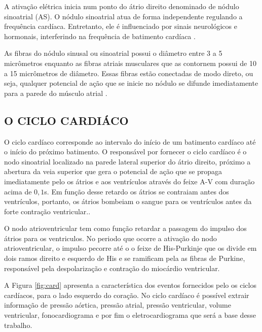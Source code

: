 \documentclass[12pt, a4paper]{article}
\begin{document}
A ativação elétrica inicia num ponto do átrio direito denominado de nódulo sinoatrial (AS). O nódulo sinoatrial atua de forma independente regulando a frequência cardíaca. Entretanto, ele é influenciado por sinais neurológicos e hormonais, interferindo na frequência de batimento cardíaca \cite{silva}.

As fibras do nódulo sinusal ou sinoatrial possui o diâmetro entre 3 a 5 micrômetros enquanto as fibras atriais musculares que as contornem possui de 10 a 15 micrômetros de diâmetro. Essas fibras estão conectadas de modo direto, ou seja, qualquer potencial de ação que se inicie no nódulo se difunde imediatamente para a parede do músculo atrial \cite{guyton}.

\subsection{O CICLO CARDIÁCO}

\hspace*{0.8cm}O ciclo cardíaco corresponde ao intervalo do início de um batimento cardíaco até o início do próximo batimento. O responsável por fornecer o ciclo cardíaco é o nodo sinoatrial localizado na parede lateral superior do átrio direito, próximo a abertura da veia superior que gera o potencial de ação que se propaga imediatamente pelo os átrios e aos ventrículos através do feixe A-V com duração acima de $0,1$s. Em função desse retardo os átrios se contraiam antes dos ventrículos, portanto, os átrios bombeiam o sangue para os ventrículos antes da forte contração ventricular.\cite{guyton}.

O nodo atrioventricular tem como função retardar a passagem do impulso dos átrios para os ventriculos. No periodo que ocorre a ativação do nodo atrioventricular, o impulso pecorre até o  o feixe de His-Purkinje que os divide em dois ramos direito e esquerdo de His e se ramificam pela as fibras de Purkine, responsável pela despolarização e contração do miocárdio ventricular.  

A Figura \ref{fig:card} apresenta a característica dos eventos fornecidos pelo os ciclos cardíacos, para o lado esquerdo do coração. No ciclo cardíaco é possível extrair informação de pressão aórtica, pressão atrial, pressão ventricular, volume ventricular, fonocardiograma e por fim o eletrocardiograma que será a base desse trabalho.
\end{document}
